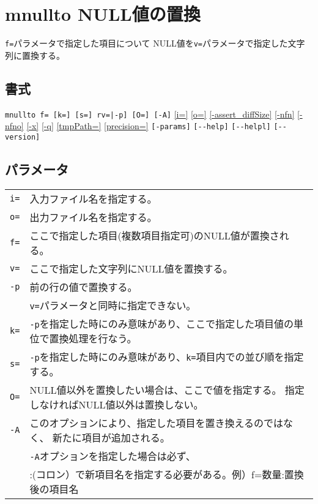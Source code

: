 
%

\section{mnullto NULL値の置換\label{sect:mnullto}}
\verb|f=|パラメータで指定した項目について
NULL値を\verb|v=|パラメータで指定した文字列に置換する。 

\subsection*{書式}
\verb/mnullto f= [k=] [s=] rv=|-p] [O=] [-A]/
\hyperref[sect:option_i]{[i=]}
\hyperref[sect:option_o]{[o=]}
\hyperref[sect:option_assert_diffSize]{[-assert\_diffSize]}
\hyperref[sect:option_nfn]{[-nfn]} 
\hyperref[sect:option_nfno]{[-nfno]}  
\hyperref[sect:option_x]{[-x]}
\hyperref[sect:option_q]{[-q]}
\hyperref[sect:option_option_tmppath]{[tmpPath=]}
\hyperref[sect:option_precision]{[precision=]}
\verb|[-params]|
\verb|[--help]|
\verb|[--helpl]|
\verb|[--version]|\\

\subsection*{パラメータ}
\begin{table}[htbp]
{\small
\begin{tabular}{ll}
\verb|i=|    & 入力ファイル名を指定する。\\
\verb|o=|    & 出力ファイル名を指定する。\\
\verb|f=|  & ここで指定した項目(複数項目指定可)のNULL値が置換される。\\
\verb|v=|  & ここで指定した文字列にNULL値を置換する。\\
\verb|-p|  & 前の行の値で置換する。\\
           & \verb|v=|パラメータと同時に指定できない。\\
\verb|k=|  & \verb|-p|を指定した時にのみ意味があり、ここで指定した項目値の単位で置換処理を行なう。\\
\verb|s=|  & \verb|-p|を指定した時にのみ意味があり、\verb|k=|項目内での並び順を指定する。\\
\verb|O=|  & NULL値以外を置換したい場合は、ここで値を指定する。
             指定しなければNULL値以外は置換しない。\\
\verb|-A|  & このオプションにより、指定した項目を置き換えるのではなく、
             新たに項目が追加される。\\
           & \verb|-A|オプションを指定した場合は必ず、\\
           & :(コロン）で新項目名を指定する必要がある。例）f=数量:置換後の項目名\\
\end{tabular} 
}
\end{table} 

